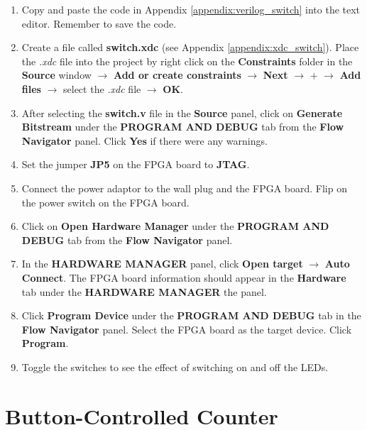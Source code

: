 \documentclass[11pt,letterpaper,titlepage]{article}
\begin{document}
\begin{enumerate}
    \item Copy and paste the code in Appendix \ref{appendix:verilog_switch} into the text editor. Remember to save the code.
    
    \item Create a file called \textbf{switch.xdc} (see Appendix \ref{appendix:xdc_switch}). Place the \textit{.xdc} file into the project by right click on the \textbf{Constraints} folder in the \textbf{Source} window $\rightarrow$ \textbf{Add or create constraints} $\rightarrow$ \textbf{Next} $\rightarrow$ \textbf{$+$} $\rightarrow$ \textbf{Add files} $\rightarrow$ select the \textit{.xdc} file $\rightarrow$ \textbf{OK}. 
    
    \item After selecting the \textbf{switch.v} file in the \textbf{Source} panel, click on \textbf{Generate Bitstream} under the \textbf{PROGRAM AND DEBUG} tab from the \textbf{Flow Navigator} panel. Click \textbf{Yes} if there were any warnings.
    
    \item Set the jumper \textbf{JP5} on the FPGA board to \textbf{JTAG}.
    
    \item Connect the power adaptor to the wall plug and the FPGA board. Flip on the power switch on the FPGA board.
    
    \item Click on \textbf{Open Hardware Manager} under the \textbf{PROGRAM AND DEBUG} tab from the \textbf{Flow Navigator} panel.
    
    \item In the \textbf{HARDWARE MANAGER} panel, click \textbf{Open target} $\rightarrow$ \textbf{Auto Connect}. The FPGA board information should appear in the \textbf{Hardware} tab under the \textbf{HARDWARE MANAGER} the panel.
    
    \item Click \textbf{Program Device} under the \textbf{PROGRAM AND DEBUG} tab in the \textbf{Flow Navigator} panel. Select the FPGA board as the target device. Click \textbf{Program}.
    
    \item Toggle the switches to see the effect of switching on and off the LEDs.
    
\end{enumerate}

\section{Button-Controlled Counter}
\end{document}
